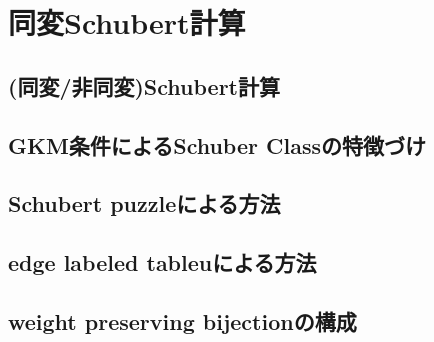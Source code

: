 \section{同変Schubert計算}
\subsection{(同変/非同変)Schubert計算}

\subsection{GKM条件によるSchuber Classの特徴づけ}

\subsection{Schubert puzzleによる方法}

\subsection{edge labeled tableuによる方法}

\subsection{weight preserving bijectionの構成}